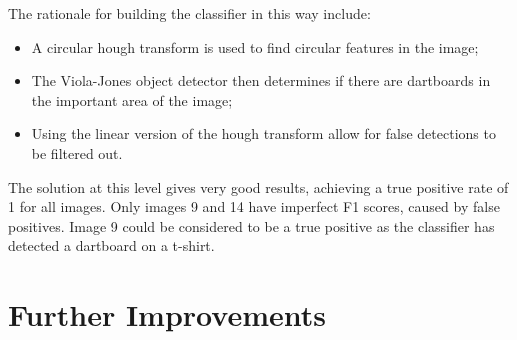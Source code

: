 \documentclass[conference]{IEEEtran}
\begin{document}
The rationale for building the classifier in this way include: 
\begin{itemize}
\item A circular hough transform is used to find circular features in the image;
\item The Viola-Jones object detector then determines if there are dartboards in the important area of the image;
\item Using the linear version of the hough transform allow for false detections to be filtered out.
\end{itemize}
\newpage
\par
The solution at this level gives very good results, achieving a true positive rate of 1 for all images. Only images 9 and 14 have imperfect F1 scores, caused by false positives. Image 9 could be considered to be a true positive as the classifier has detected a dartboard on a t-shirt. 




\newpage
\section{Further Improvements}
\end{document}
